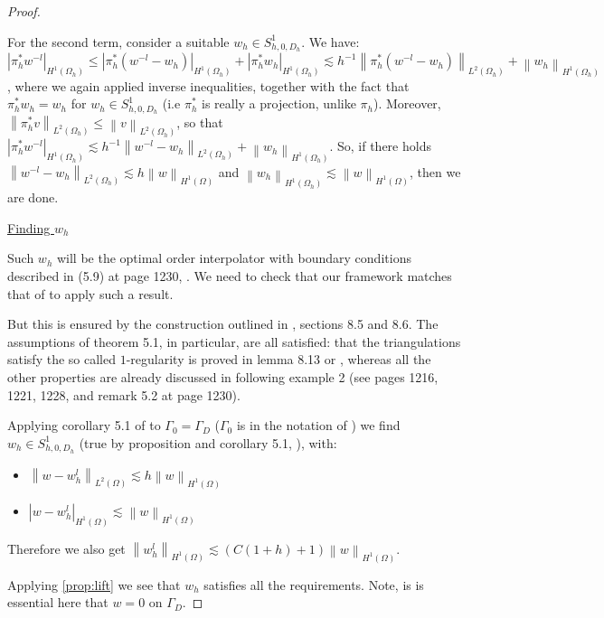\documentclass[english,a4paper,9pt,oneside]{scrbook}	%
\theoremstyle{break}
\newenvironment{mproof}[1][\proofname]{%
  \begin{proof}[#1]$ $\par\nobreak\ignorespaces
}{%
  \end{proof}
}
\renewcommand*{\proofname}{Proof}
\theoremstyle{remark}
\newcommand{\norm}[1]{\left\lVert#1\right\rVert}
\begin{document}
\begin{appendices}
\begin{mproof}
For the second term, consider a suitable $w_h \in S^{1}_{h,0,D_h}$. We have: $|\pi_h^* w^{-l}|_{H^1(\Omega_h)}\leq |\pi_h^* (w^{-l}-w_h)|_{H^1(\Omega_h)} +|\pi_h^* w_h|_{H^1(\Omega_h)}\lesssim h^{-1}\norm{\pi_h^*(w^{-l}-w_h)}_{L^2(\Omega_h)} +\norm{w_h}_{H^1(\Omega_h)}$, where we again applied inverse inequalities, together with the fact that $\pi_h^* w_h = w_h$ for $w_h \in S^1_{h,0,D_h}$ (i.e $\pi_h^*$ is really a projection, unlike $\pi_h$). Moreover, $\norm{\pi_h^* v}_{L^2(\Omega_h)}\leq \norm{v}_{L^2(\Omega_h)}$, so that $|\pi_h^* w^{-l}|_{H^1(\Omega_h)} \lesssim h^{-1}\norm{w^{-l}-w_h}_{L^2(\Omega_h)} +\norm{w_h}_{H^1(\Omega_h)}$. So, if there holds $\norm{w^{-l}-w_h}_{L^2(\Omega_h)}\lesssim h \norm{w}_{H^1(\Omega)}$ and $\norm{w_h}_{H^1(\Omega_h)}\lesssim \norm{w}_{H^1(\Omega)}$, then we are done.

\underline{Finding $w_h$}

Such $w_h$ will be the optimal order interpolator with boundary conditions described in (5.9) at page 1230, \cite{bernardi}. We need to check that our framework matches that of \cite{bernardi} to apply such a result.

But this is ensured by the construction outlined in \cite{ranner}, sections 8.5 and 8.6. The assumptions of theorem 5.1, in particular, are all satisfied: that the triangulations satisfy the so called $1$-regularity is proved in lemma 8.13 or \cite{ranner}, whereas all the other properties are already discussed in \cite{bernardi} following example 2 (see pages 1216, 1221, 1228, and remark 5.2 at page 1230).

Applying corollary 5.1 of \cite{bernardi} to $\Gamma_0=\Gamma_D$ ($\Gamma_0$ is in the notation of \cite{bernardi}) we find $w_h \in S^{1}_{h,0,D_h}$ (true by proposition and corollary 5.1, \cite{bernardi}), with:

\begin{itemize}
	\item $\norm{w-w_h^l}_{L^2(\Omega)}\lesssim h \norm{w}_{H^1(\Omega)}$
	\item $|w-w_h^l|_{H^1(\Omega)}\lesssim \norm{w}_{H^1(\Omega)}$
\end{itemize}

Therefore we also get $\norm{w_h^l}_{H^1(\Omega)} \lesssim(C(1+h)+1)\norm{w}_{H^1(\Omega)}$.

Applying \cref{prop:lift} we see that $w_h$ satisfies all the requirements. Note, is is essential here that $w=0$ on $\Gamma_D$.

\end{mproof}


\end{appendices}
\end{document}
